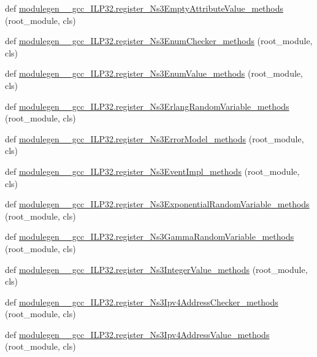 \begin{DoxyCompactItemize}
\item 
def \hyperlink{namespacemodulegen____gcc__ILP32_a4f1a7f7e506590df165bd2f16ec88878}{modulegen\+\_\+\+\_\+gcc\+\_\+\+I\+L\+P32.\+register\+\_\+\+Ns3\+Empty\+Attribute\+Value\+\_\+methods} (root\+\_\+module, cls)
\item 
def \hyperlink{namespacemodulegen____gcc__ILP32_ae5912f10b50cb9b22868a90b1a8af6ff}{modulegen\+\_\+\+\_\+gcc\+\_\+\+I\+L\+P32.\+register\+\_\+\+Ns3\+Enum\+Checker\+\_\+methods} (root\+\_\+module, cls)
\item 
def \hyperlink{namespacemodulegen____gcc__ILP32_ae326f463de72e46c155fc6b4d513b935}{modulegen\+\_\+\+\_\+gcc\+\_\+\+I\+L\+P32.\+register\+\_\+\+Ns3\+Enum\+Value\+\_\+methods} (root\+\_\+module, cls)
\item 
def \hyperlink{namespacemodulegen____gcc__ILP32_a303a1d3c5897c3befc105fd1ae0555a3}{modulegen\+\_\+\+\_\+gcc\+\_\+\+I\+L\+P32.\+register\+\_\+\+Ns3\+Erlang\+Random\+Variable\+\_\+methods} (root\+\_\+module, cls)
\item 
def \hyperlink{namespacemodulegen____gcc__ILP32_a850e877bd655932937a870db3091edd6}{modulegen\+\_\+\+\_\+gcc\+\_\+\+I\+L\+P32.\+register\+\_\+\+Ns3\+Error\+Model\+\_\+methods} (root\+\_\+module, cls)
\item 
def \hyperlink{namespacemodulegen____gcc__ILP32_a600366111aadb7115136bfec5f8675e7}{modulegen\+\_\+\+\_\+gcc\+\_\+\+I\+L\+P32.\+register\+\_\+\+Ns3\+Event\+Impl\+\_\+methods} (root\+\_\+module, cls)
\item 
def \hyperlink{namespacemodulegen____gcc__ILP32_aece736044889d144f4bee4d03b7de81b}{modulegen\+\_\+\+\_\+gcc\+\_\+\+I\+L\+P32.\+register\+\_\+\+Ns3\+Exponential\+Random\+Variable\+\_\+methods} (root\+\_\+module, cls)
\item 
def \hyperlink{namespacemodulegen____gcc__ILP32_a12228d101ebfb3792bcdf5f3d4749309}{modulegen\+\_\+\+\_\+gcc\+\_\+\+I\+L\+P32.\+register\+\_\+\+Ns3\+Gamma\+Random\+Variable\+\_\+methods} (root\+\_\+module, cls)
\item 
def \hyperlink{namespacemodulegen____gcc__ILP32_a4b61c0b25893bff5747f1c50aeb73acb}{modulegen\+\_\+\+\_\+gcc\+\_\+\+I\+L\+P32.\+register\+\_\+\+Ns3\+Integer\+Value\+\_\+methods} (root\+\_\+module, cls)
\item 
def \hyperlink{namespacemodulegen____gcc__ILP32_a91bc88170d5111bf6c9c0defc82f9018}{modulegen\+\_\+\+\_\+gcc\+\_\+\+I\+L\+P32.\+register\+\_\+\+Ns3\+Ipv4\+Address\+Checker\+\_\+methods} (root\+\_\+module, cls)
\item 
def \hyperlink{namespacemodulegen____gcc__ILP32_a9b966337400674f232afe6830aa55a11}{modulegen\+\_\+\+\_\+gcc\+\_\+\+I\+L\+P32.\+register\+\_\+\+Ns3\+Ipv4\+Address\+Value\+\_\+methods} (root\+\_\+module, cls)

\end{DoxyCompactItemize}
